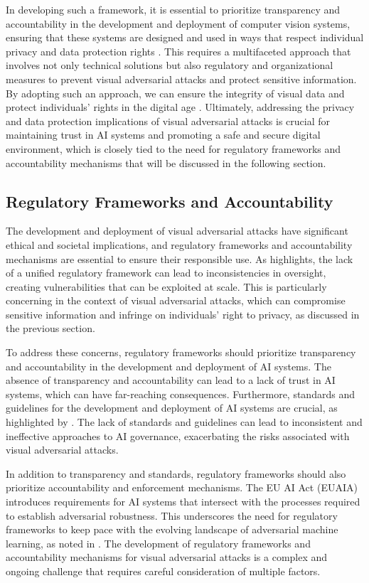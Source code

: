 \documentclass[11pt]{article}
\begin{document}
In developing such a framework, it is essential to prioritize transparency and accountability in the development and deployment of computer vision systems, ensuring that these systems are designed and used in ways that respect individual privacy and data protection rights \cite{ref171}. This requires a multifaceted approach that involves not only technical solutions but also regulatory and organizational measures to prevent visual adversarial attacks and protect sensitive information. By adopting such an approach, we can ensure the integrity of visual data and protect individuals' rights in the digital age \cite{ref172}. Ultimately, addressing the privacy and data protection implications of visual adversarial attacks is crucial for maintaining trust in AI systems and promoting a safe and secure digital environment, which is closely tied to the need for regulatory frameworks and accountability mechanisms that will be discussed in the following section.

\subsection{Regulatory Frameworks and Accountability}

The development and deployment of visual adversarial attacks have significant ethical and societal implications, and regulatory frameworks and accountability mechanisms are essential to ensure their responsible use. As \cite{ref156} highlights, the lack of a unified regulatory framework can lead to inconsistencies in oversight, creating vulnerabilities that can be exploited at scale. This is particularly concerning in the context of visual adversarial attacks, which can compromise sensitive information and infringe on individuals' right to privacy, as discussed in the previous section.

To address these concerns, regulatory frameworks should prioritize transparency and accountability in the development and deployment of AI systems. The absence of transparency and accountability can lead to a lack of trust in AI systems, which can have far-reaching consequences. Furthermore, standards and guidelines for the development and deployment of AI systems are crucial, as highlighted by \cite{ref173}. The lack of standards and guidelines can lead to inconsistent and ineffective approaches to AI governance, exacerbating the risks associated with visual adversarial attacks.

In addition to transparency and standards, regulatory frameworks should also prioritize accountability and enforcement mechanisms. The EU AI Act (EUAIA) introduces requirements for AI systems that intersect with the processes required to establish adversarial robustness. This underscores the need for regulatory frameworks to keep pace with the evolving landscape of adversarial machine learning, as noted in \cite{ref90}. The development of regulatory frameworks and accountability mechanisms for visual adversarial attacks is a complex and ongoing challenge that requires careful consideration of multiple factors.
\end{document}
